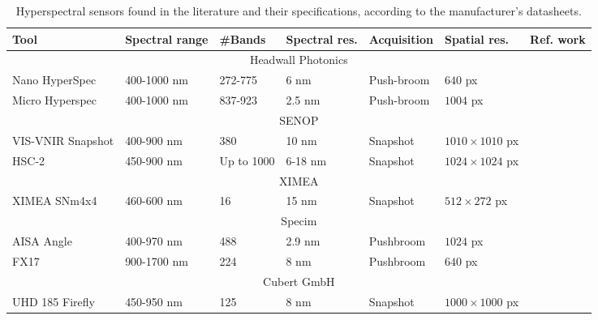 \renewcommand{\arraystretch}{1.2}
\begin{table}[h]
    \small
    \caption{Hyperspectral sensors found in the literature and their specifications, according to the manufacturer's datasheets.}
    \label{table:hyperspectral_devices}
    \begin{tabular}{lllllll}
        \toprule
        Tool & Spectral range & \#Bands & Spectral res. & Acquisition & Spatial res. & Ref. work \\
        \midrule
        \multicolumn{7}{c}{Headwall Photonics}\\
        Nano HyperSpec & 400-1000 \si{\nano\meter}   & 272-775 & 6 \si{\nano\meter}  & Push-broom    & $640$ px  &\cite{sankey_uav_2018, sousa_uav-based_2022}\\
        Micro Hyperspec & 400-1000 \si{\nano\meter}   & 837-923 & 2.5 \si{\nano\meter}  & Push-broom    & $1004$ px  &\cite{sousa_uav-based_2022}\\
        \cmidrule{1-7}
        \multicolumn{7}{c}{SENOP}\\
        VIS-VNIR Snapshot & 400-900 \si{\nano\meter}   & 380 & 10 \si{\nano\meter}  & Snapshot    & $1010\times1010$ px & \cite{sousa_uav-based_2022}\\
        HSC-2 & 450-900 \si{\nano\meter}   & Up to 1000 & 6-18 \si{\nano\meter}  & Snapshot    & $1024\times1024$ px & \cite{sousa_uav-based_2022}\\
        \cmidrule{1-7}
        \multicolumn{7}{c}{XIMEA}\\
        XIMEA SNm4x4 & 460-600 \si{\nano\meter}   & 16 & 15 \si{\nano\meter}  & Snapshot    & $512\times272$ px & \cite{gao_cbff-net_2023}\\
        \cmidrule{1-7}
        \multicolumn{7}{c}{Specim}\\
        AISA Angle & 400-970 \si{\nano\meter}   & 488 & 2.9 \si{\nano\meter}  & Pushbroom    & $1024$ px & \cite{windrim_unsupervised_2023}\\
        FX17 & 900-1700 \si{\nano\meter}   & 224 & 8 \si{\nano\meter}  & Pushbroom    & $640$ px & \cite{sousa_uav-based_2022}\\
        \cmidrule{1-7}
        \multicolumn{7}{c}{Cubert GmbH}\\
        UHD 185 Firefly & 450-950 \si{\nano\meter}   & 125 & 8 \si{\nano\meter}  & Snapshot    & $1000\times1000$ px & \cite{yue_comparison_2018}\\
        \bottomrule
    \end{tabular}
\end{table}
\renewcommand{\arraystretch}{1}

